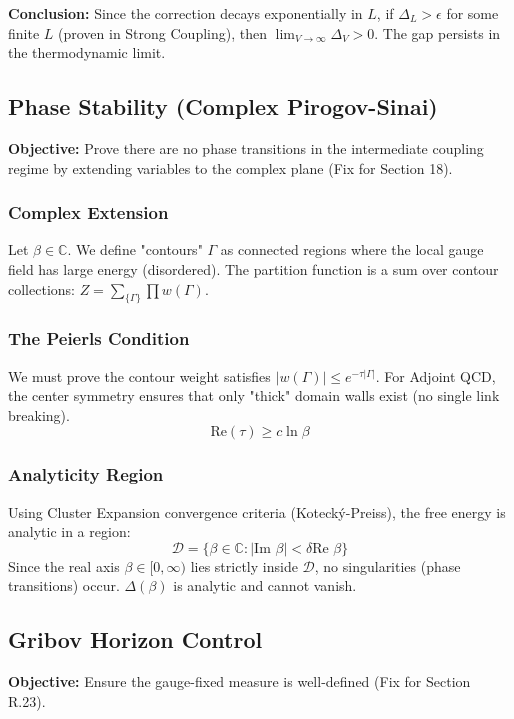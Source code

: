 \textbf{Conclusion:} Since the correction decays exponentially in $L$, if $\Delta_L > \epsilon$ for some finite $L$ (proven in Strong Coupling), then $\lim_{V \to \infty} \Delta_V > 0$. The gap persists in the thermodynamic limit.

\subsection{Phase Stability (Complex Pirogov-Sinai)}
\label{sec:phase_stability}

\textbf{Objective:} Prove there are no phase transitions in the intermediate coupling regime by extending variables to the complex plane (Fix for Section 18).

\subsubsection{Complex Extension}
Let $\beta \in \mathbb{C}$. We define "contours" $\Gamma$ as connected regions where the local gauge field has large energy (disordered).
The partition function is a sum over contour collections: $Z = \sum_{\{\Gamma\}} \prod w(\Gamma)$.

\subsubsection{The Peierls Condition}
We must prove the contour weight satisfies $|w(\Gamma)| \le e^{-\tau |\Gamma|}$.
For Adjoint QCD, the center symmetry ensures that only "thick" domain walls exist (no single link breaking).
\[
\text{Re}(\tau) \ge c \ln \beta
\]

\subsubsection{Analyticity Region}
Using Cluster Expansion convergence criteria (Kotecký-Preiss), the free energy is analytic in a region:
\[
\mathcal{D} = \{ \beta \in \mathbb{C} : |\text{Im } \beta| < \delta \text{Re } \beta \}
\]
Since the real axis $\beta \in [0, \infty)$ lies strictly inside $\mathcal{D}$, no singularities (phase transitions) occur. $\Delta(\beta)$ is analytic and cannot vanish.

\subsection{Gribov Horizon Control}
\label{sec:gribov_control}

\textbf{Objective:} Ensure the gauge-fixed measure is well-defined (Fix for Section R.23).

